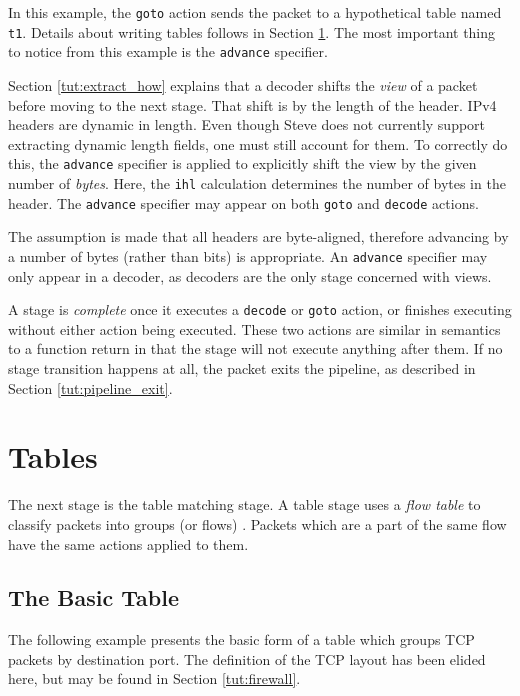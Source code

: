 In this example, the \texttt{goto} action sends the packet to a hypothetical table
named \texttt{t1}. Details about writing tables follows in Section \ref{tut:table}. The most important thing to notice from this example is the
\texttt{advance} specifier.

Section \ref{tut:extract_how} explains that a decoder shifts the
\textit{view} of a packet before moving to the next stage. That shift is by the
length of the header. IPv4 headers are dynamic in length. Even though Steve does not
currently support extracting dynamic length fields, one must still account for
them. To correctly do this, the \texttt{advance} specifier is applied to
explicitly shift the view by the given number of \textit{bytes}. 
Here, the \texttt{ihl} calculation determines the number of bytes in the header.
The \texttt{advance} specifier may appear on both \texttt{goto} and \texttt{decode} actions.

The assumption is made that all headers are byte-aligned, therefore advancing by
a number of bytes (rather than bits) is appropriate. An
\texttt{advance} specifier may only appear in a decoder, as decoders are the only
stage concerned with views.

A stage is \textit{complete} once it executes a \texttt{decode} or \texttt{goto} action, or
finishes executing without either action being executed. 
These two actions are similar in semantics to a function return
in that the stage will not execute anything after them.
If no stage transition happens at all,
the packet exits the pipeline, as described in Section \ref{tut:pipeline_exit}.

\section{Tables} \label{tut:table}

The next stage is the table matching stage. 
A table stage uses a \emph{flow table} to classify packets into
groups (or flows) \cite{openflow_spec}. 
Packets which are a part of the same flow have the same actions applied to them.

\subsection{The Basic Table} \label{tut:basic_table}

The following example presents the basic form of a table which
groups TCP packets by destination port. The definition of the TCP
layout has been elided here, but may be found in Section \ref{tut:firewall}.

